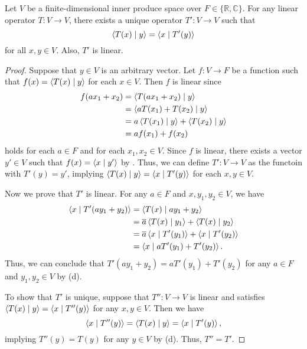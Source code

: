 \begin{theorem}
  Let $V$ be a finite-dimensional inner produce space over
  $F \in \{\mathbb{R}, \mathbb{C}\}$.
  For any linear operator $T: V \to V$, there exists a unique operator
  $T': V \to V$ such that
  \begin{equation*}
    \left\langle T(x) \; \middle| \; y \right\rangle = \left\langle x \; \middle| \; T'(y) \right\rangle
  \end{equation*}
  for all $x, y \in V$.
  Also, $T'$ is linear.
\end{theorem}
\begin{proof}
  Suppose that $y \in V$ is an arbitrary vector.
  Let $f: V \to F$ be a function such that $f(x) = \left\langle T(x) \; \middle| \; y \right\rangle$ for each
  $x \in V$.
  Then $f$ is linear since
  \begin{align*}
    f(ax_1 + x_2)
    &= \left\langle T(ax_1 + x_2) \; \middle| \; y \right\rangle \\
    &= \left\langle aT(x_1) + T(x_2) \; \middle| \; y \right\rangle \\
    &= a\left\langle T(x_1) \; \middle| \; y \right\rangle + \left\langle T(x_2) \; \middle| \; y \right\rangle \\
    &= af(x_1) + f(x_2)
  \end{align*}
  holds for each $a \in F$ and for each $x_1, x_2 \in V$.
  Since $f$ is linear, there exists a vector $y' \in V$ such that
  $f(x) = \left\langle x \; \middle| \; y' \right\rangle$ by .
  Thus, we can define $T': V \to V$ as the functoin with $T'(y) = y'$,
  implying $\left\langle T(x) \; \middle| \; y \right\rangle = \left\langle x \; \middle| \; T'(y) \right\rangle$ for each $x, y \in V$.

  Now we prove that $T'$ is linear.
  For any $a \in F$ and $x, y_1, y_2 \in V$, we have
  \begin{align*}
    \left\langle x \; \middle| \; T'(ay_1 + y_2) \right\rangle
    &= \left\langle T(x) \; \middle| \; ay_1 + y_2 \right\rangle \\
    &= \overline{a}\left\langle T(x) \; \middle| \; y_1 \right\rangle + \left\langle T(x) \; \middle| \; y_2 \right\rangle \\
    &= \overline{a}\left\langle x \; \middle| \; T'(y_1) \right\rangle + \left\langle x \; \middle| \; T'(y_2) \right\rangle \\
    &= \left\langle x \; \middle| \; aT'(y_1) + T'(y_2) \right\rangle.
  \end{align*}
  Thus, we can conclude that $T'(ay_1 + y_2) = aT'(y_1) + T'(y_2)$ for any
  $a \in F$ and $y_1, y_2 \in V$ by  (d).

  To show that $T'$ is unique, suppose that $T'': V \to V$ is linear and
  satisfies $\left\langle T(x) \; \middle| \; y \right\rangle = \left\langle x \; \middle| \; T''(y) \right\rangle$ for any $x, y \in V$.
  Then we have
  \begin{equation*}
    \left\langle x \; \middle| \; T''(y) \right\rangle = \left\langle T(x) \; \middle| \; y \right\rangle = \left\langle x \; \middle| \; T'(y) \right\rangle,
  \end{equation*}
  implying $T''(y) = T(y)$ for any $y \in V$ by 
  (d).
  Thus, $T'' = T'$.
\end{proof}

